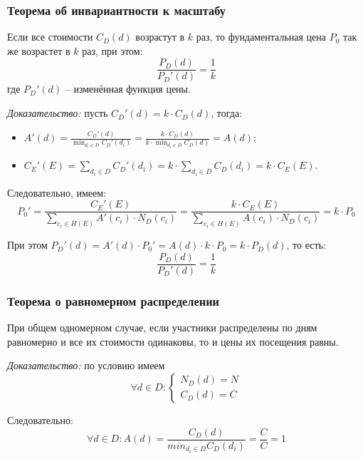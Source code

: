 \subsubsection{Теорема об инвариантности к масштабу}

Если все стоимости $C_D(d)$ возрастут в $k$ раз, то фундаментальная цена $P_0$ так же возрастет в $k$ раз, при этом:
\begin{equation}
	\frac{P_D(d)}{P_D'(d)} = \frac{1}{k}
\end{equation}
где $P_D'(d)$ -- изменённая функция цены.

\textit{Доказательство:} пусть $C_D'(d) = k \cdot C_D(d)$, тогда:
\begin{itemize}[label=--]
	\item $A'(d) = \frac{C_D'(d)}{\min_{d_i \in D}{C_D'(d_i)}} = \frac{k \cdot C_D(d)}{k \cdot \min_{d_i \in D}{C_D(d)}} = A(d)$;
	\item $C_E'(E) = \sum_{d_i \in D}{C_D'(d_i)} = k \cdot \sum_{d_i \in D}{C_D(d_i)} = k \cdot C_E(E)$.
\end{itemize}

Следовательно, имеем:
\begin{equation}
	P_0' = \frac{C_E'(E)}{\sum_{c_i \in H(E)}{A'(c_i) \cdot N_D(c_i)}} = \frac{k \cdot C_E(E)}{\sum_{c_i \in H(E)}{A(c_i) \cdot N_D(c_i)}} = k \cdot P_0
\end{equation}

При этом $P_D'(d) = A'(d) \cdot P_0' = A(d) \cdot k \cdot P_0 = k \cdot P_D(d)$, то есть:
\begin{equation}
	\frac{P_D(d)}{P_D'(d)} = \frac{1}{k}
\end{equation}

\subsubsection{Теорема о равномерном распределении}

При общем одномерном случае, если участники распределены по дням равномерно и все их стоимости одинаковы, то и цены их посещения равны.

\textit{Доказательство:} по условию имеем
\begin{equation}
	\forall d \in D:
	\begin{cases}
		N_D(d) = N \\
		C_D(d) = C
	\end{cases}
\end{equation}

Следовательно:
\begin{equation}
	\forall d \in D: A(d) = \frac{C_D(d)}{min_{d_i \in D}{C_D(d_i)}} = \frac{C}{C} = 1
\end{equation}

